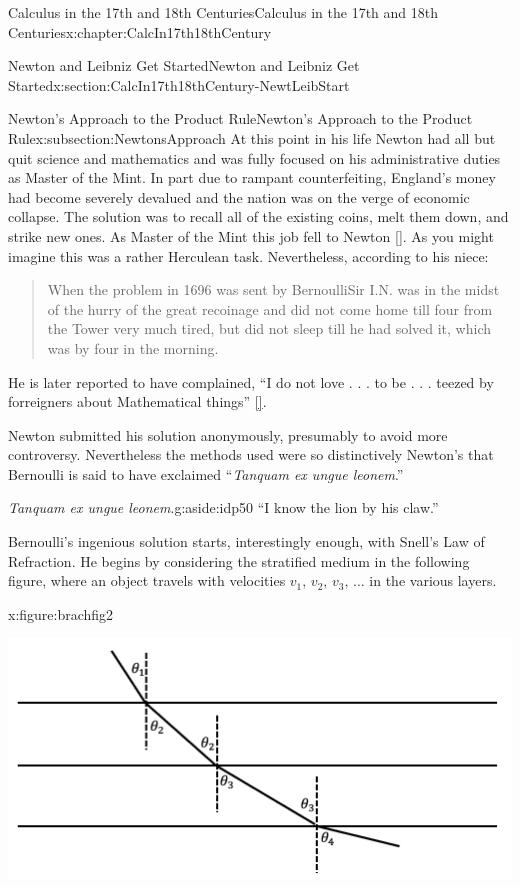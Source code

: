 \begin{chapterptx}{Calculus in the 17th and 18th Centuries}{}{Calculus in the 17th and 18th Centuries}{}{}{x:chapter:CalcIn17th18thCentury}
\begin{sectionptx}{Newton and Leibniz Get Started}{}{Newton and Leibniz Get Started}{}{}{x:section:CalcIn17th18thCentury-NewtLeibStart}
\begin{subsectionptx}{Newton's Approach to the Product Rule}{}{Newton's Approach to the Product Rule}{}{}{x:subsection:NewtonsApproach}
			At this point in his life Newton had all but quit science and mathematics and was fully focused on his administrative duties as Master of the Mint.  In part due to rampant counterfeiting, England's money had become severely devalued and the nation was on the verge of economic collapse.  The solution was to recall all of the existing coins, melt them down, and strike new ones.  As Master of the Mint this job fell to Newton \hyperlink{x:biblio:levenson09__newton_count}{[{}]}.  As you might imagine this was a rather Herculean task.  Nevertheless, according to his niece:%
			\begin{quote}%
				When the problem in 1696 was sent by Bernoulli\textendash{}Sir I.N. was in the midst of the hurry of the great recoinage and did not come home till four from the Tower very much tired, but did not sleep till he had solved it, which was by four in the morning.%
			\end{quote}
			He is later reported to have complained, ``I do not love . . . to be . . . teezed by forreigners about Mathematical things'' \hyperlink{x:biblio:dunham90__journ_throug_genius}{[{}]}.%
			\par
			 Newton submitted his solution anonymously, presumably to avoid more controversy.  Nevertheless the methods used were so distinctively Newton's that Bernoulli is said to have exclaimed ``\textit{Tanquam ex ungue leonem}.''%
			\begin{aside}{\textit{Tanquam ex ungue leonem}.}{g:aside:idp50}%
				``I know the lion by his claw.''%
			\end{aside}
			 Bernoulli's ingenious solution starts, interestingly enough, with Snell's Law of Refraction. He begins by considering the stratified medium in the following figure, where an object travels with velocities \(v_1,\,v_2,\,v_3,\,\ldots\) in the various layers.%
			\begin{figureptx}{}{x:figure:brachfig2}{}%
				\begin{image}{0.125}{0.75}{0.125}%
					\includegraphics[width=\linewidth]{external/images/brachfig2.png}

\end{image}
\end{figureptx}
\end{subsectionptx}
\end{sectionptx}
\end{chapterptx}
